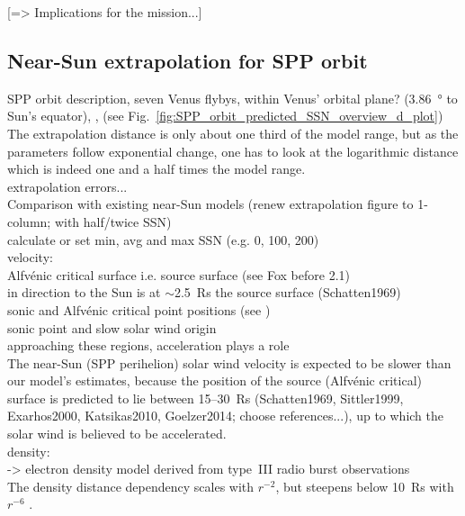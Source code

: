[=> Implications for the mission...]\\

\subsection{Near-Sun extrapolation for SPP orbit}

SPP orbit description, seven Venus flybys, within Venus' orbital plane? (\SI{3.86}{\degree} to Sun's equator), \citep{Fox2015}, (see Fig.~\ref{fig:SPP_orbit_predicted_SSN_overview_d_plot})\\

The extrapolation distance is only about one third of the model range, but as the parameters follow exponential change, one has to look at the logarithmic distance which is indeed one and a half times the model range.\\

extrapolation errors...\\
Comparison with existing near-Sun models (renew extrapolation figure to 1-column; with half/twice SSN)\\
calculate or set min, avg and max SSN (e.g. 0, 100, 200)\\

velocity:\\
Alfvénic critical surface i.e. source surface (see Fox before 2.1)\\
in direction to the Sun is at $\sim$2.5~Rs the source surface (Schatten1969)\\
sonic and Alfvénic critical point positions (see \citet{Sittler1999})\\
sonic point and slow solar wind origin \citep{Sheeley1997}\\
approaching these regions, acceleration plays a role\\

The near-Sun (SPP perihelion) solar wind velocity is expected to be slower than our model's estimates, because the position of the source (Alfvénic critical) surface is predicted to lie between 15--30~Rs (Schatten1969, Sittler1999, Exarhos2000, Katsikas2010, Goelzer2014; choose references...), up to which the solar wind is believed to be accelerated.\\

density:\\
\citet{Leblanc1998} -> electron density model derived from type~III radio burst observations\\
The density distance dependency scales with $r^{-2}$, but steepens below 10~Rs with $r^{-6}$ \citep{Leblanc1998}.\\

